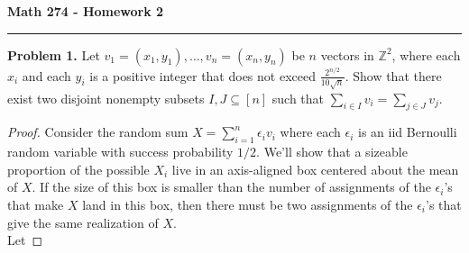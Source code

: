 \documentclass[11pt,letterpaper]{report}
\newcommand{\integers}{\mathbb{Z}}
\begin{document}
\begin{center}
{\bf \Large Math 274 - Homework 2}
\vspace{0.2cm}
\hrule
\end{center}

\noindent\textbf{Problem 1. }
Let $v_1 = (x_1, y_1), \ldots, v_n = (x_n, y_n)$ be $n$ vectors in $\integers^2$, where each $x_i$ and each $y_i$ is a positive integer that does not exceed $\frac{2^{n/2}}{10\sqrt{n}}$.
Show that there exist two disjoint nonempty subsets $I, J\subseteq [n]$ such that $\sum_{i\in I}v_i = \sum_{j\in J}v_j$.

\begin{proof}
    Consider the random sum $X = \sum_{i=1}^n \epsilon_iv_i$ where each $\epsilon_i$ is an iid Bernoulli random variable with success probability $1/2$.
    We'll show that a sizeable proportion of the possible $X_i$ live in an axis-aligned box centered about the mean of $X$.
    If the size of this box is smaller than the number of assignments of the $\epsilon_i$'s that make $X$ land in this box, then there must be two assignments of the $\epsilon_i$'s that give the same realization of $X$.\\

    Let 
\end{proof}
\end{document}

